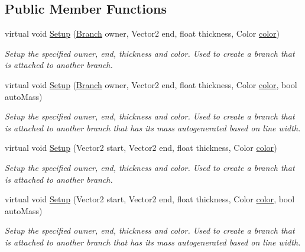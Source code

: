 \subsection*{Public Member Functions}
\begin{DoxyCompactItemize}
\item 
virtual void \hyperlink{class_fractal_tree_1_1_stationary_branch_acaa0bef74389db9f1a2f57af38557000}{Setup} (\hyperlink{interface_fractal_tree_1_1_branch}{Branch} owner, Vector2 end, float thickness, Color \hyperlink{class_fractal_tree_1_1_stationary_branch_a265ca67d50299986adb192386fc7b932}{color})
\begin{DoxyCompactList}\small\item\em Setup the specified owner, end, thickness and color. Used to create a branch that is attached to another branch. \end{DoxyCompactList}\item 
virtual void \hyperlink{class_fractal_tree_1_1_stationary_branch_a262c5810fadbd2c8aea1f2afdca57126}{Setup} (\hyperlink{interface_fractal_tree_1_1_branch}{Branch} owner, Vector2 end, float thickness, Color \hyperlink{class_fractal_tree_1_1_stationary_branch_a265ca67d50299986adb192386fc7b932}{color}, bool auto\+Mass)
\begin{DoxyCompactList}\small\item\em Setup the specified owner, end, thickness and color. Used to create a branch that is attached to another branch that has its mass autogenerated based on line width. \end{DoxyCompactList}\item 
virtual void \hyperlink{class_fractal_tree_1_1_stationary_branch_a62e1aa7062ef70a8726dfe21a9e28d76}{Setup} (Vector2 start, Vector2 end, float thickness, Color \hyperlink{class_fractal_tree_1_1_stationary_branch_a265ca67d50299986adb192386fc7b932}{color})
\begin{DoxyCompactList}\small\item\em Setup the specified owner, end, thickness and color. Used to create a branch that is attached to another branch. \end{DoxyCompactList}\item 
virtual void \hyperlink{class_fractal_tree_1_1_stationary_branch_a61cfd43bb83cf63bf1ad25f339866d7a}{Setup} (Vector2 start, Vector2 end, float thickness, Color \hyperlink{class_fractal_tree_1_1_stationary_branch_a265ca67d50299986adb192386fc7b932}{color}, bool auto\+Mass)
\begin{DoxyCompactList}\small\item\em Setup the specified owner, end, thickness and color. Used to create a branch that is attached to another branch that has its mass autogenerated based on line width. \end{DoxyCompactList}\item 

\end{DoxyCompactItemize}
